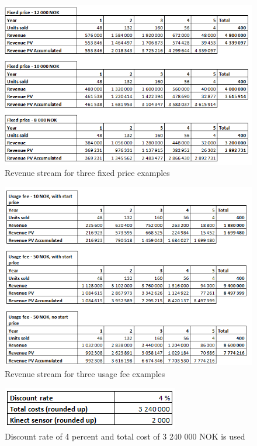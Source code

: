 \begin{figure}
\begin{center}
\includegraphics[scale=0.8]{revenuepvappendixfixed}
\caption{Revenue stream for three fixed price examples}
\label{fig:revenueFixed}
\end{center}
\end{figure}

\begin{figure}
\begin{center}
\includegraphics[scale=0.8]{revenuepvappendixusage}
\caption{Revenue stream for three usage fee examples}
\label{fig:revenueUsage}
\end{center}
\end{figure}

\begin{figure}
\begin{center}
\includegraphics[scale=0.8]{revenuepvappendixassumptations}
\caption{Discount rate of 4 percent and total cost of 3 240 000 NOK is used}
\label{fig:revenuePVassump}
\end{center}
\end{figure}

